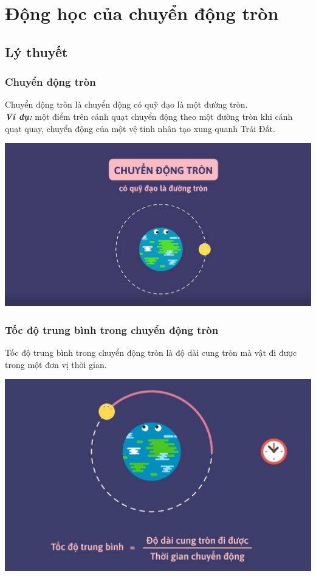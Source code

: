 \let\lesson\undefined
\newcommand{\lesson}{\phantomlesson{Bài 20: Động học của chuyển động tròn.}}
\chapter[Động học của chuyển động tròn]{Động học của chuyển động tròn}
\setcounter{section}{0}
\section{Lý thuyết}
\subsection{Chuyển động tròn}
Chuyển động tròn là chuyển động có quỹ đạo là một đường tròn.\\
\textbf{\textit{Ví dụ:}} một điểm trên cánh quạt chuyển động theo một đường tròn khi cánh quạt quay, chuyển động của một vệ tinh nhân tạo xung quanh Trái Đất.
\begin{center}
	\includegraphics[scale=0.3]{../figs/VN10-PH-06-L-005-1-V2-01.jpg}
\end{center}
\subsection{Tốc độ trung bình trong chuyển động tròn}
 Tốc độ trung bình trong chuyển động tròn là độ dài cung tròn mà vật đi được trong một đơn vị thời gian.
\begin{center}
	\includegraphics[scale=0.3]{../figs/VN10-PH-06-L-005-1-V2-02.jpg}
\end{center}
